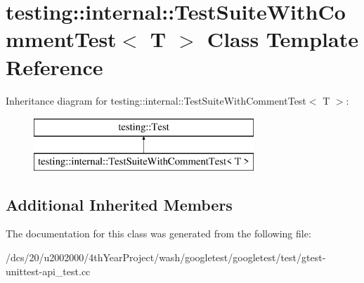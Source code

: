 \hypertarget{classtesting_1_1internal_1_1TestSuiteWithCommentTest}{}\section{testing\+:\+:internal\+:\+:Test\+Suite\+With\+Comment\+Test$<$ T $>$ Class Template Reference}
\label{classtesting_1_1internal_1_1TestSuiteWithCommentTest}
Inheritance diagram for testing\+:\+:internal\+:\+:Test\+Suite\+With\+Comment\+Test$<$ T $>$\+:\begin{figure}[H]
\begin{center}
\leavevmode
\includegraphics[height=2.000000cm]{classtesting_1_1internal_1_1TestSuiteWithCommentTest}
\end{center}
\end{figure}
\subsection*{Additional Inherited Members}


The documentation for this class was generated from the following file\+:\begin{DoxyCompactItemize}
\item 
/dcs/20/u2002000/4th\+Year\+Project/wash/googletest/googletest/test/gtest-\/unittest-\/api\+\_\+test.\+cc\end{DoxyCompactItemize}
